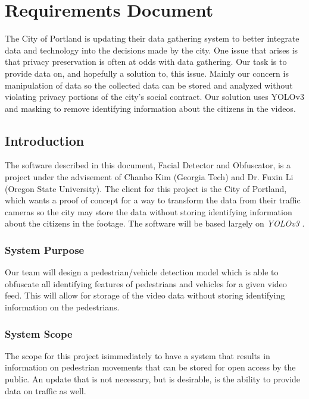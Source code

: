 \chapter{Requirements Document}

The City of Portland is updating their data gathering system to better integrate data and technology into the decisions made by the city. One issue that arises is that privacy preservation is often at odds with data gathering. Our task is to provide data on, and hopefully a solution to, this issue. Mainly our concern is manipulation of data so the collected data can be stored and analyzed without violating privacy portions of the city's social contract. Our solution uses YOLOv3 and masking to remove identifying information about the citizens in the videos.

\section{Introduction}

The software described in this document, Facial Detector and Obfuscator, is a project under the advisement of Chanho Kim (Georgia Tech) and Dr. Fuxin Li (Oregon State University). The client for this project is the City of Portland, which wants a proof of concept for a way to transform the data from their traffic cameras so the city may store the data without storing identifying information about the citizens in the footage. The software will be based largely on \textit{YOLOv3} \cite{YOLOv3}.

\subsection{System Purpose}

Our team will design a pedestrian/vehicle detection model which is able to obfuscate all identifying features of pedestrians and vehicles for a given video feed. This will allow for storage of the video data without storing identifying information on the pedestrians.

\subsection{System Scope}

The scope for this project isimmediately to have a system that results in information on pedestrian movements that can be stored for open access by the public. An update that is not necessary, but is desirable, is the ability to provide data on traffic as well.

